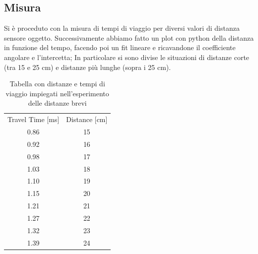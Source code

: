 \documentclass[10pt, a4paper, italian]{article}
\begin{document}
\subsection{Misura}
Si è proceduto con la misura di tempi di viaggio per diversi valori di distanza sensore oggetto. Successivamente abbiamo fatto un plot con python della distanza in funzione del tempo, facendo poi un fit lineare e ricavandone il coefficiente angolare e l'intercetta; In particolare si sono divise le situazioni di distanze corte (tra 15 e 25 cm) e distanze più lunghe (sopra i 25 cm).
\begin{table}[H]
\centering
\begin{tabular}{cc}
Travel Time [ms] & Distance [cm] \\
0.86 & 15   \\
0.92 & 16   \\
0.98 & 17   \\
1.03 & 18  \\
1.10 & 19   \\
1.15 & 20   \\
1.21 & 21   \\
1.27 & 22   \\
1.32 & 23  \\
1.39 & 24 
\end{tabular}
\caption{Tabella con distanze e tempi di viaggio impiegati nell'esperimento delle distanze brevi}
\end{table}
\end{document}
